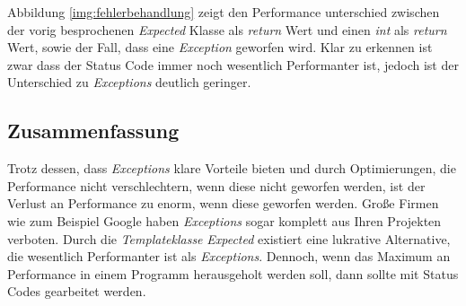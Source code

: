 Abbildung \ref{img:fehlerbehandlung} zeigt den Performance unterschied zwischen der vorig
besprochenen \emph{Expected} Klasse als \emph{return} Wert und einen \emph{int} als \emph{return}
Wert, sowie der Fall, dass eine \emph{Exception} geworfen wird. Klar zu erkennen ist zwar dass
der Status Code immer noch wesentlich Performanter ist, jedoch ist der Unterschied zu
\emph{Exceptions} deutlich geringer.

\subsection{Zusammenfassung}
Trotz dessen, dass \emph{Exceptions} klare Vorteile bieten und durch Optimierungen, die
Performance nicht verschlechtern, wenn diese nicht geworfen werden, ist der Verlust an
Performance zu enorm, wenn diese geworfen werden. Große Firmen wie zum Beispiel Google haben
\emph{Exceptions} sogar komplett aus Ihren Projekten verboten. Durch die \emph{Templateklasse}
\emph{Expected} existiert eine lukrative Alternative, die wesentlich Performanter ist als
\emph{Exceptions}. Dennoch, wenn das Maximum an Performance in einem Programm herausgeholt werden
soll, dann sollte mit Status Codes gearbeitet werden.